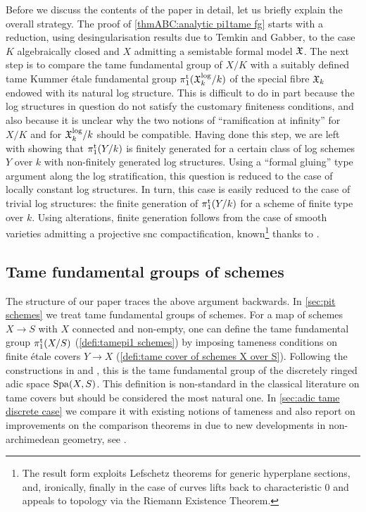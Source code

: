 Before we discuss the contents of the paper in detail, let us briefly explain the overall strategy. The proof of \cref{thmABC:analytic pi1tame fg} starts with a reduction, using desingularisation results due to Temkin and Gabber, to the case $K$ algebraically closed and $X$ admitting a semistable formal model ${\mathfrak{X}}$. The next step is to compare the tame fundamental group of $X/K$ with a suitably defined tame Kummer \'etale fundamental group $\pi_1^{\mathrm{t}}({\mathfrak{X}}^{\log}_k/k)$ of the special fibre ${\mathfrak{X}}_k$ endowed with its natural log structure. This is difficult to do in part because the log structures in question do not satisfy the customary finiteness conditions, and also because it is unclear why the two notions of ``ramification at infinity'' for $X/K$ and for ${\mathfrak{X}}^{\log}_k/k$ should be compatible. Having done this step, we are left with showing that $\pi_1^{\mathrm{t}}(Y/k)$ is finitely generated for a certain class of log schemes $Y$ over $k$ with non-finitely generated log structures. Using a ``formal gluing'' type argument along the log stratification, this question is reduced to the case of locally constant log structures. In turn, this case is easily reduced to the case of trivial log structures: the finite generation of $\pi_1^{\mathrm{t}}(Y/k)$ for a scheme of finite type over $k$. Using alterations, finite generation follows from the case of smooth varieties admitting a projective snc compactification, known\footnote{The result form \cite{EsnaultKindler2016:LefschetzTheoremsTamely} exploits Lefschetz theorems for generic hyperplane sections, and, ironically, finally in the case of curves lifts back to characteristic $0$ and appeals to topology via the Riemann Existence Theorem.} thanks to \cite{EsnaultKindler2016:LefschetzTheoremsTamely}. 


\subsection*{Tame fundamental groups of schemes}

The structure of our paper traces the above argument backwards. In \cref{sec:pit schemes} we treat tame fundamental groups of schemes. For a map of schemes $X\to S$ with $X$ connected and non-empty, one can define the tame fundamental group $\pi_1^{\mathrm{t}}(X/S)$ (\cref{defi:tamepi1 schemes}) by imposing tameness conditions on finite \'etale covers $Y\to X$ (\cref{defi:tame cover of schemes X over S}). Following the constructions in \cite{Temkin2011:RelativeRiemannZariskiSpacesa} and \cite{Hubner2021:AdicTameSite}, this is the tame fundamental group of the discretely ringed adic space $\operatorname{Spa}(X,S)$.
This definition is non-standard in the classical literature on tame covers but should be considered the most natural one.
In \cref{sec:adic tame discrete case} we compare it with existing notions of tameness and also report on improvements on the comparison theorems in \cite{KerzSchmidt2010:DifferentNotionsTameness} due to new developments in non-archimedean geometry, see \cite{HuebnerTemkin2026:WildLocus}.

